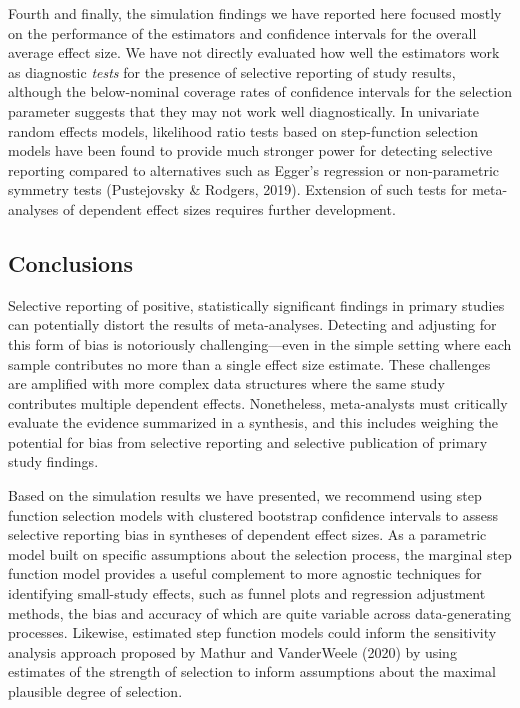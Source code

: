 \documentclass[
  american,
  man, donotrepeattitle,floatsintext]{apa7}
\begin{document}
Fourth and finally, the simulation findings we have reported here focused mostly on the performance of the estimators and confidence intervals for the overall average effect size.
We have not directly evaluated how well the estimators work as diagnostic \emph{tests} for the presence of selective reporting of study results, although the below-nominal coverage rates of confidence intervals for the selection parameter suggests that they may not work well diagnostically.
In univariate random effects models, likelihood ratio tests based on step-function selection models have been found to provide much stronger power for detecting selective reporting compared to alternatives such as Egger's regression or non-parametric symmetry tests (Pustejovsky \& Rodgers, 2019).
Extension of such tests for meta-analyses of dependent effect sizes requires further development.

\subsection{Conclusions}\label{conclusions}

Selective reporting of positive, statistically significant findings in primary studies can potentially distort the results of meta-analyses.
Detecting and adjusting for this form of bias is notoriously challenging---even in the simple setting where each sample contributes no more than a single effect size estimate.
These challenges are amplified with more complex data structures where the same study contributes multiple dependent effects.
Nonetheless, meta-analysts must critically evaluate the evidence summarized in a synthesis, and this includes weighing the potential for bias from selective reporting and selective publication of primary study findings.

Based on the simulation results we have presented, we recommend using step function selection models with clustered bootstrap confidence intervals to assess selective reporting bias in syntheses of dependent effect sizes. As a parametric model built on specific assumptions about the selection process, the marginal step function model provides a useful complement to more agnostic techniques for identifying small-study effects, such as funnel plots and regression adjustment methods, the bias and accuracy of which are quite variable across data-generating processes. Likewise, estimated step function models could inform the sensitivity analysis approach proposed by Mathur and VanderWeele (2020) by using estimates of the strength of selection to inform assumptions about the maximal plausible degree of selection.
\end{document}
